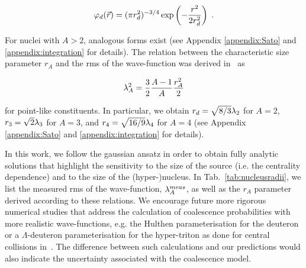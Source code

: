 \begin{equation}\label{eq:WaveHeinz}
 \varphi_{d}(\vec{r}) = (\pi r_{d}^2)^{-3/4} \exp\left(-{r^2 \over 2 r_{d}^2}\right) \;.
\end{equation}

\noindent For nuclei with $A > 2$, analogous forms exist (see Appendix \ref{appendix:Sato} and \ref{appendix:integration} for details). The relation between the characteristic size parameter $r_{A}$ and the rms of the wave-function was derived in~\cite{Shebeko:2006ud} as

\begin{equation}
 \lambda_{A}^2 = {3 \over 2}{A - 1 \over A} {r_{A}^2 \over 2}
\end{equation} 

\noindent for point-like constituents. In particular, we obtain $r_{d}= \sqrt{8/3}  \lambda_{2}$ for $A = 2$, $r_{3}= \sqrt{2}{\lambda_{3}}$ for $A = 3$, and  $r_{4}= \sqrt{16/9} \lambda_{4}$ for $A=4$ (see Appendix \ref{appendix:Sato} and \ref{appendix:integration} for details).

In this work, we follow the gaussian ansatz in order to obtain fully analytic solutions that highlight the sensitivity to the size of the source (i.e. the centrality dependence) and to the size of the (hyper-)nucleus. 
In Tab.~\ref{tab:nucleusradii}, we list the measured rms of the wave-function, $\lambda_{A}^{meas}$, as well as the $r_{A}$ parameter derived according to these relations. 
We encourage future more rigorous numerical studies that address the calculation of coalescence probabilities with more realistic wave-functions, e.g. the Hulthen parameterisation for the deuteron \cite{Nagle:1996vp} or a $\Lambda$-deuteron parameterisation for the hyper-triton as done for central collisions in~\cite{Zhang:2018euf}. The difference between such calculations and our predictions would also indicate the uncertainty associated with the coalescence model. 

